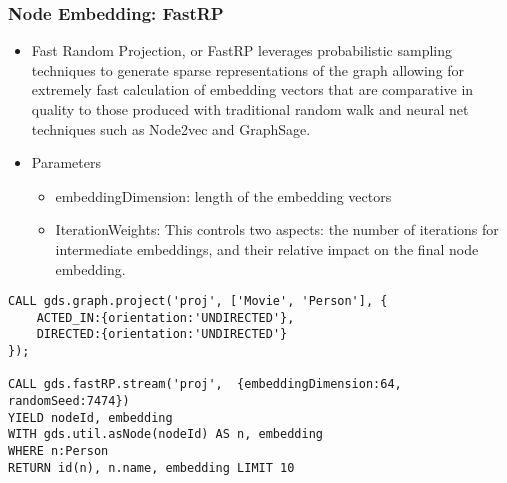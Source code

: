 \begin{frame}[fragile]\frametitle{Node Embedding: FastRP}

\begin{itemize}
\item Fast Random Projection, or FastRP leverages probabilistic sampling techniques to generate sparse representations of the graph allowing for extremely fast calculation of embedding vectors that are comparative in quality to those produced with traditional random walk and neural net techniques such as Node2vec and GraphSage. 
\item Parameters
	\begin{itemize}
	\item embeddingDimension: length of the embedding vectors
	\item IterationWeights: This controls two aspects: the number of iterations for intermediate embeddings, and their relative impact on the final node embedding.
	\end{itemize}
\end{itemize}

\begin{lstlisting}
CALL gds.graph.project('proj', ['Movie', 'Person'], {
    ACTED_IN:{orientation:'UNDIRECTED'},
    DIRECTED:{orientation:'UNDIRECTED'}
});

CALL gds.fastRP.stream('proj',  {embeddingDimension:64, randomSeed:7474})
YIELD nodeId, embedding
WITH gds.util.asNode(nodeId) AS n, embedding
WHERE n:Person
RETURN id(n), n.name, embedding LIMIT 10
\end{lstlisting}

\end{frame}

